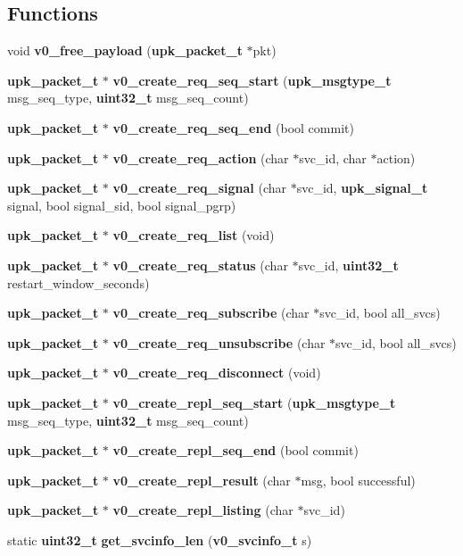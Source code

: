 \subsection*{Functions}
\begin{DoxyCompactItemize}
\item 
void {\bf v0\_\-free\_\-payload} ({\bf upk\_\-packet\_\-t} $\ast$pkt)
\item 
{\bf upk\_\-packet\_\-t} $\ast$ {\bf v0\_\-create\_\-req\_\-seq\_\-start} ({\bf upk\_\-msgtype\_\-t} msg\_\-seq\_\-type, {\bf uint32\_\-t} msg\_\-seq\_\-count)
\item 
{\bf upk\_\-packet\_\-t} $\ast$ {\bf v0\_\-create\_\-req\_\-seq\_\-end} (bool commit)
\item 
{\bf upk\_\-packet\_\-t} $\ast$ {\bf v0\_\-create\_\-req\_\-action} (char $\ast$svc\_\-id, char $\ast$action)
\item 
{\bf upk\_\-packet\_\-t} $\ast$ {\bf v0\_\-create\_\-req\_\-signal} (char $\ast$svc\_\-id, {\bf upk\_\-signal\_\-t} signal, bool signal\_\-sid, bool signal\_\-pgrp)
\item 
{\bf upk\_\-packet\_\-t} $\ast$ {\bf v0\_\-create\_\-req\_\-list} (void)
\item 
{\bf upk\_\-packet\_\-t} $\ast$ {\bf v0\_\-create\_\-req\_\-status} (char $\ast$svc\_\-id, {\bf uint32\_\-t} restart\_\-window\_\-seconds)
\item 
{\bf upk\_\-packet\_\-t} $\ast$ {\bf v0\_\-create\_\-req\_\-subscribe} (char $\ast$svc\_\-id, bool all\_\-svcs)
\item 
{\bf upk\_\-packet\_\-t} $\ast$ {\bf v0\_\-create\_\-req\_\-unsubscribe} (char $\ast$svc\_\-id, bool all\_\-svcs)
\item 
{\bf upk\_\-packet\_\-t} $\ast$ {\bf v0\_\-create\_\-req\_\-disconnect} (void)
\item 
{\bf upk\_\-packet\_\-t} $\ast$ {\bf v0\_\-create\_\-repl\_\-seq\_\-start} ({\bf upk\_\-msgtype\_\-t} msg\_\-seq\_\-type, {\bf uint32\_\-t} msg\_\-seq\_\-count)
\item 
{\bf upk\_\-packet\_\-t} $\ast$ {\bf v0\_\-create\_\-repl\_\-seq\_\-end} (bool commit)
\item 
{\bf upk\_\-packet\_\-t} $\ast$ {\bf v0\_\-create\_\-repl\_\-result} (char $\ast$msg, bool successful)
\item 
{\bf upk\_\-packet\_\-t} $\ast$ {\bf v0\_\-create\_\-repl\_\-listing} (char $\ast$svc\_\-id)
\item 
static {\bf uint32\_\-t} {\bf get\_\-svcinfo\_\-len} ({\bf v0\_\-svcinfo\_\-t} s)
\item 

\end{DoxyCompactItemize}
